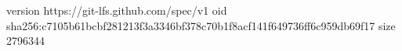 version https://git-lfs.github.com/spec/v1
oid sha256:c7105b61bcbf281213f3a3346bf378c70b1f8acf141f649736ff6c959db69f17
size 2796344

